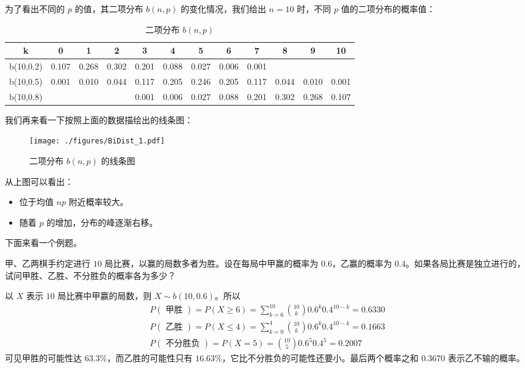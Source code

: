为了看出不同的 $p $ 的值，其二项分布 $b(n ,p) $ 的变化情况，我们给出 $n=10$ 时，不同 $p $ 值的二项分布的概率值：
\begin{table}[ht]
\centering
\caption{二项分布 $b(n, p)$}\label{BiDist_tab1}
\begin{tabular}{|c|c|c|c|c|c|c|c|c|c|c|c|}
\hline
k & 0 & 1 & 2 & 3 & 4 & 5 & 6 & 7 & 8 & 9 & 10 \\
\hline
b(10,0.2) & 0.107 & 0.268 & 0.302 & 0.201 & 0.088 & 0.027 & 0.006 & 0.001 & & & \\
\hline
b(10,0.5) & 0.001 & 0.010 & 0.044 & 0.117 & 0.205 & 0.246 & 0.205 & 0.117 & 0.044 & 0.010 & 0.001 \\
\hline
b(10,0.8) & & & & 0.001 & 0.006 & 0.027 & 0.088 & 0.201 & 0.302 & 0.268 & 0.107 \\
\hline
\end{tabular}
\end{table}
我们再来看一下按照上面的数据描绘出的线条图：
\begin{figure}[ht]
\centering
\texttt{[image: ./figures/BiDist\_1.pdf]}
\caption{二项分布 $b(n,p)$ 的线条图} \label{BiDist_fig1}
\end{figure}

从上图可以看出：
\begin{itemize}
\item 位于均值 $np$ 附近概率较大。
\item 随着 $p $ 的增加，分布的峰逐渐右移。
\end{itemize}

下面来看一个例题。
\begin{example}{}
甲、乙两棋手约定进行 $10 $ 局比赛，以赢的局数多者为胜。设在每局中甲赢的概率为 $0.6$，乙赢的概率为 $0. 4$。如果各局比赛是独立进行的，试问甲胜、乙胜、不分胜负的概率各为多少？

以 $X $ 表示 $10 $ 局比赛中甲赢的局数，则 $X\sim b(10,0. 6)$。所以
\begin{equation}
\begin{aligned}P(\text { 甲胜 })=P(X \geqslant 6)=\sum_{k=6}^{10}\binom{10}{k} 0.6^{k} 0.4^{10-k}=0.6330 \\ P(\text { 乙胜 })=P(X \leqslant 4)=\sum_{k=0}^{4}\binom{10}{k} 0.6^{k} 0.4^{10-k}=0.1663 \\ P(\text { 不分胜负 })=P(X=5)=\binom{10}{5} 0.6^{5} 0.4^{5}=0.2007\end{aligned}
\end{equation}
可见甲胜的可能性达 $63. 3\%$，而乙胜的可能性只有 $16. 63\% $，它比不分胜负的可能性还要小。最后两个概率之和 $0. 367 0 $ 表示乙不输的概率。
\end{example}


